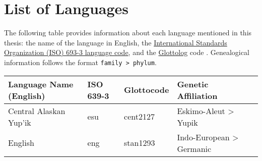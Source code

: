 \chapter*{List of Languages}
\label{ch:languages}

The following table provides information about each language mentioned in this thesis: the name of the language in English, the \href{https://iso639-3.sil.org/}{International Standards Organization (ISO) 693-3 language code}, and the \href{https://glottolog.org/}{Glottolog} code \citep{HammarstromForkelHaspelmath2019}. Genealogical information follows the format \texttt{family > phylum}.

\renewcommand{\arraystretch}{1}

\begin{table}[h]
  \onehalfspacing
  \begin{tabularx}{\linewidth}{ l l l l l }
    \textbf{Language Name (English)} & \textbf{ISO 639-3} & \textbf{Glottocode} & \textbf{Genetic Affiliation}\\
    \midrule
    Central Alaskan Yup'ik           & esu                & cent2127            & Eskimo-Aleut > Yupik\\
    English                          & eng                & stan1293            & Indo-European > Germanic\\
  \end{tabularx}
\end{table}
